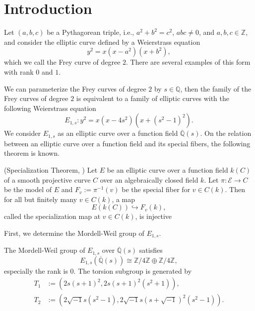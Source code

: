 \documentclass[main]{subfiles}
\begin{document}
\chapter{Introduction}
Let $(a,b,c)$ be a Pythagorean triple, i.e., $a^{2} + b^{2} = c^{2}$, $abc\neq0$, and $a,b,c \in \mathbb{Z}$, and consider the elliptic curve defined by a Weierstrass equation
\begin{equation}
    y^{2} = x(x - a^{2})(x + b^{2}),
\end{equation}
which we call the Frey curve of degree $2$.
There are several examples of this form with rank $0$ and $1$.

We can parameterize the Frey curves of degree $2$ by $s \in \mathbb{Q}$, then the family of the Frey curves of degree $2$ is equivalent to a family of elliptic curves with the following Weierstrass equation
\begin{equation}
    E_{1,s}: y^{2} = x(x - 4s^{2})(x + (s^{2} - 1)^{2}).
\end{equation}
We consider $E_{1,s}$ as an elliptic curve over a function field $\overline{\mathbb{Q}}(s)$.
On the relation between an elliptic curve over a function field and its special fibers, the following theorem is known.
\begin{thm}{(Specialization Theorem, \cite[Theorem 11.4.]{ref:advancedaec})}
    \label{thm:specialization}
    Let $E$ be an elliptic curve over a function field $k(C)$ of a smooth projective curve $C$ over an algebraically closed field $k$.
    Let $\pi: \mathcal{E} \to C$ be the \Neron{} model of $E$ and $F_v:=\pi^{-1}(v)$ be the special fiber for $v \in C(k)$.
    Then for all but finitely many $v \in C(k)$, a map
    \begin{equation}
        E(k(C)) \hookrightarrow F_{v}(k),
    \end{equation}
    called the specialization map at $v \in C(k)$, is injective
\end{thm}

First, we determine the Mordell-Weil group of $E_{1,s}$.

\begin{thm}
    \label{thm:E_{1,s}}
    The Mordell-Weil group of $E_{1,s}$ over $\overline{\mathbb{Q}}(s)$ satisfies
    \begin{equation}
        E_{1,s}(\overline{\mathbb{Q}}(s)) \cong \mathbb{Z} / 4 \mathbb{Z} \oplus \mathbb{Z} / 4 \mathbb{Z},
    \end{equation}
    especially the rank is $0$. The torsion subgroup is generated by
    \begin{align}
        T_1 & := (2s(s+1)^2, 2s(s+1)^2(s^2+1)),                              \\
        T_2 & := (2 \sqrt{-1} s(s^2-1),2 \sqrt{-1} s(s+\sqrt{-1})^2(s^2-1)).
    \end{align}
\end{thm}
\end{document}
